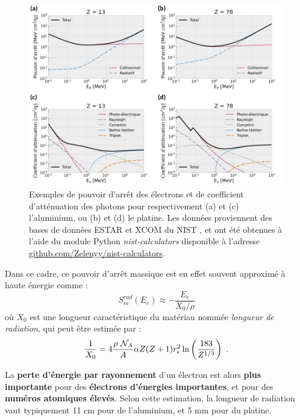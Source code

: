 \begin{refsection}
\begin{figure}[t]
	\centering
	\includegraphics[width=0.9\linewidth]{1-particules/exemples_electrons_photons.png}
    \caption{Exemples de pouvoir d'arrêt des électrons et de coefficient d'atténuation des photons pour respectivement (a) et (c) l'aluminium, ou (b) et (d) le platine. Les données proviennent des bases de données ESTAR et XCOM du NIST \parencite{berger_1999,berger_1999a}, et ont été obtenues à l'aide du module Python \textit{nist-calculators} disponible à l'adresse \href{https://github.com/Zelenyy/nist-calculators}{github.com/Zelenyy/nist-calculators}.}
    \label{fig:12-exemples_electrons_photons}
\end{figure}

Dans ce cadre, ce pouvoir d'arrêt massique est en effet souvent approximé à haute énergie comme \parencite{carron_2007} :
\begin{equation}
    S_m^{rad}(E_e) \approx -\dfrac{E_e}{X_0/\rho}
\end{equation}
où $X_0$ est une longueur caractéristique du matériau nommée \textit{longueur de radiation}, qui peut être estimée par \parencite{carron_2007} :
\begin{equation}
    \dfrac{1}{X_0} = 4 \dfrac{\rho ~ \mathcal{N}_A}{A} \alpha Z (Z+1) r_e^2 \ln\left(\dfrac{183}{Z^{1/3}}\right) ~ \rm .
\end{equation}

La \textbf{perte d'énergie par rayonnement} d'un électron est alors \textbf{plus importante} pour des \textbf{électrons d'énergies importantes}, et pour des \textbf{numéros atomiques élevés}. Selon cette estimation, la longueur de radiation vaut typiquement 11 cm pour de l'aluminium, et 5 mm pour du platine.


\end{refsection}
